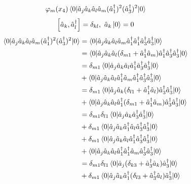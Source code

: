 \documentclass[11pt, a4paper]{article}
\begin{document}
\begin{enumerate}
\begin{align*}
                              \varphi_m(x_4) \braket{0|\hat a_j\hat a_k\hat a_l
                              \hat a_m (\hat a_1^{\dagger})^2(\hat a_3^{\dagger})^2|0}
    \end{align*}
    \begin{equation*}
        \left[\hat a_k,  \hat a_l^{\dagger}\right] = \delta_{kl}, ~ \hat a_k\ket 0 = 0
    \end{equation*}
    \begin{align*}
        \braket{0|\hat a_j\hat a_k\hat a_l\hat a_m (\hat a_1^{\dagger})^2(\hat a_3^{\dagger})^2|0}
        & = \braket{0|\hat a_j\hat a_k\hat a_l\hat a_m\hat a_1^{\dagger}\hat a_1^{\dagger}\hat a_3^{\dagger}\hat a_3^{\dagger}|0}
        \\
        & = \braket{0|\hat a_j\hat a_k\hat a_l(\delta_{m1} + \hat a_1^{\dagger}\hat a_m)\hat a_1^{\dagger}\hat a_3^{\dagger}\hat a_3^{\dagger}|0}
        \\
        & = \delta_{m1}\braket{0|\hat a_j\hat a_k\hat a_l\hat a_1^{\dagger}\hat a_3^{\dagger}\hat a_3^{\dagger}|0}\\
        & + \braket{0|\hat a_j\hat a_k\hat a_l \hat a_1^{\dagger}\hat a_m \hat a_1^{\dagger}\hat a_3^{\dagger}\hat a_3^{\dagger}|0}
        \\
        & = \delta_{m1}\braket{0|\hat a_j\hat a_k (\delta_{l1} + \hat a_1^{\dagger}\hat a_l) \hat a_3^{\dagger}\hat a_3^{\dagger}|0}\\
        & +  \braket{0|\hat a_j\hat a_k\hat a_l \hat a_1^{\dagger} (\delta_{m1} + \hat a_1^{\dagger}\hat a_m) \hat a_3^{\dagger}\hat a_3^{\dagger}|0}
        \\
        & = \delta_{m1}\delta_{l1}\braket{0|\hat a_j\hat a_k \hat a_3^{\dagger}\hat a_3^{\dagger}|0} \\
        & + \delta_{m1}\braket{0|\hat a_j\hat a_k \hat a_1^{\dagger}\hat a_l\hat a_3^{\dagger}\hat a_3^{\dagger}|0}\\
        & + \delta_{m1} \braket{0|\hat a_j\hat a_k\hat a_l \hat a_1^{\dagger}\hat a_3^{\dagger}\hat a_3^{\dagger}|0}\\
        & + \braket{0|\hat a_j\hat a_k\hat a_l \hat a_1^{\dagger}\hat a_1^{\dagger} \hat a_m \hat a_3^{\dagger}\hat a_3^{\dagger}|0}
        \\
        & = \delta_{m1}\delta_{l1}\braket{0|\hat a_j(\delta_{k3} + \hat a_3^{\dagger}\hat a_k)\hat a_3^{\dagger}|0} \\
        & + \delta_{m1}\braket{0|\hat a_j\hat a_k \hat a_1^{\dagger} (\delta_{l3} + \hat a_3^{\dagger}\hat a_l) \hat a_3^{\dagger}|0}\\

\end{align*}
\end{enumerate}
\end{document}
